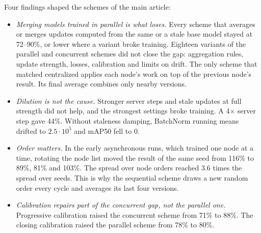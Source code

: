 \documentclass[pdflatex,sn-mathphys-num]{sn-jnl}
\begin{document}
Four findings shaped the schemes of the main article:
\begin{itemize}
\item \emph{Merging models trained in parallel is what loses.} Every scheme that averages or merges updates computed from the same or a stale base model stayed at 72--90\%, or lower where a variant broke training. Eighteen variants of the parallel and concurrent schemes did not close the gap: aggregation rules, update strength, losses, calibration and limits on drift. The only scheme that matched centralized applies each node's work on top of the previous node's result. Its final average combines only nearby versions.
\item \emph{Dilution is not the cause.} Stronger server steps and stale updates at full strength did not help, and the strongest settings broke training. A 4$\times$ server step gave 44\%. Without staleness damping, BatchNorm running means drifted to $2.5\cdot10^5$ and mAP50 fell to 0.
\item \emph{Order matters.} In the early asynchronous runs, which trained one node at a time, rotating the node list moved the result of the same seed from 116\% to 89\%, 81\% and 103\%. The spread over node orders reached 3.6 times the spread over seeds. This is why the sequential scheme draws a new random order every cycle and averages its last four versions.
\item \emph{Calibration repairs part of the concurrent gap, not the parallel one.} Progressive calibration raised the concurrent scheme from 71\% to 88\%. The closing calibration raised the parallel scheme from 78\% to 80\%.
\end{itemize}
\end{document}
